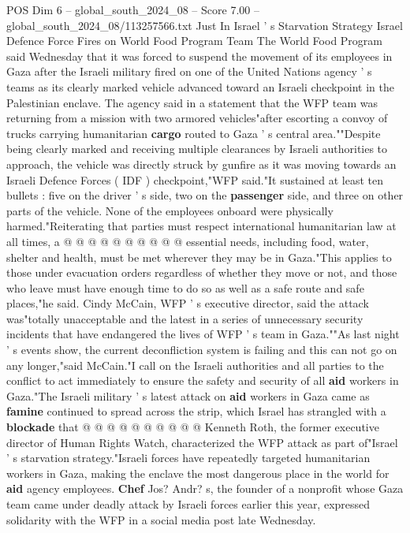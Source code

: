 \begin{textsample}{POS Dim 6 – global\_south\_2024\_08 – Score 7.00 – global\_south\_2024\_08/113257566.txt}  \label{ex:f6_pos_383}
Just In Israel ' s Starvation Strategy Israel Defence Force Fires on World Food Program Team The World Food Program said Wednesday that it was forced to suspend the movement of its employees in Gaza after the Israeli military fired on one of the United Nations agency ' s teams as its clearly marked vehicle advanced toward an Israeli checkpoint in the Palestinian enclave.
The agency said in a statement that the WFP team was returning from a mission with two armored vehicles"after escorting a convoy of trucks carrying humanitarian \textbf{cargo} routed to Gaza ' s central area.""Despite being clearly marked and receiving multiple clearances by Israeli authorities to approach, the vehicle was directly struck by gunfire as it was moving towards an Israeli Defence Forces ( IDF ) checkpoint,"WFP said."It sustained at least ten bullets : five on the driver ' s side, two on the \textbf{passenger} side, and three on other parts of the vehicle.
None of the employees onboard were physically harmed."Reiterating that parties must respect international humanitarian law at all times, a @ @ @ @ @ @ @ @ @ @ essential needs, including food, water, shelter and health, must be met wherever they may be in Gaza."This applies to those under evacuation orders regardless of whether they move or not, and those who leave must have enough time to do so as well as a safe route and safe places,"he said.
Cindy McCain, WFP ' s executive director, said the attack was"totally unacceptable and the latest in a series of unnecessary security incidents that have endangered the lives of WFP ' s team in Gaza.""As last night ' s events show, the current deconfliction system is failing and this can not go on any longer,"said McCain."I call on the Israeli authorities and all parties to the conflict to act immediately to ensure the safety and security of all \textbf{aid} workers in Gaza."The Israeli military ' s latest attack on \textbf{aid} workers in Gaza came as \textbf{famine} continued to spread across the strip, which Israel has strangled with a \textbf{blockade} that @ @ @ @ @ @ @ @ @ @ Kenneth Roth, the former executive director of Human Rights Watch, characterized the WFP attack as part of"Israel ' s starvation strategy."Israeli forces have repeatedly targeted humanitarian workers in Gaza, making the enclave the most dangerous place in the world for \textbf{aid} agency employees. \textbf{Chef} Jos?
Andr? s, the founder of a nonprofit whose Gaza team came under deadly attack by Israeli forces earlier this year, expressed solidarity with the WFP in a social media post late Wednesday.

\end{textsample}
